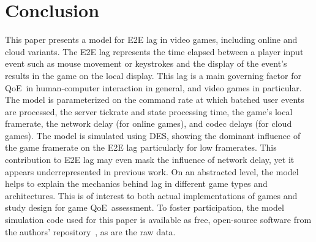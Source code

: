 \section{Conclusion}
\label{sec:conclusion}


This paper presents a model for \acrfull{E2E} lag in video games, including online and cloud variants. The \gls{E2E} lag represents the time elapsed between a player input event such as mouse movement or keystrokes and the display of the event's results in the game on the local display. This lag is a main governing factor for \acrfull{QoE} in human-computer interaction in general, and video games in particular. The model is parameterized on the command rate at which batched user events are processed, the server tickrate and state processing time, the game's local framerate, the network delay (for online games), and codec delays (for cloud games). %
The model is simulated using \acrfull{DES}, showing the dominant influence of the game framerate on the \gls{E2E} lag particularly for low framerates. This contribution to \gls{E2E} lag may even mask the influence of network delay, yet it appears underrepresented in previous work.  On an abstracted level, the model helps to explain the mechanics behind lag in different game types and architectures. This is of interest to both actual implementations of games and study design for game \gls{QoE} assessment. To foster participation, the model simulation code used for this paper is available as free, open-source software from the authors' repository~\cite{onlinegame-lag-sim-repo}, as are the raw data.
%
%
%
%
